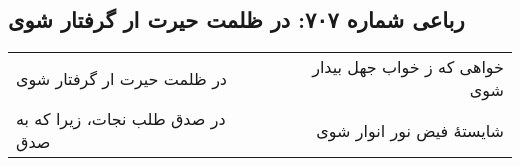 \begin{center}
\section*{رباعی شماره ۷۰۷: در ظلمت حیرت ار گرفتار شوی}
\label{sec:sh707}
\begin{longtable}{l p{0.5cm} r}
در ظلمت حیرت ار گرفتار شوی
&&
خواهی که ز خواب جهل بیدار شوی
\\
در صدق طلب نجات، زیرا که به صدق
&&
شایستهٔ فیض نور انوار شوی
\\
\end{longtable}
\end{center}
